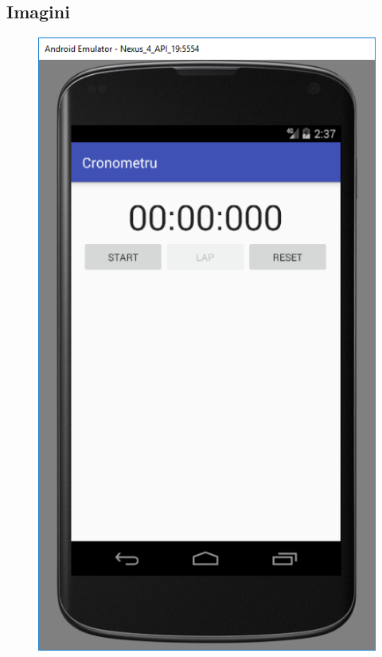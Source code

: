 \subsection{Imagini}

\begin{figure}[ht]
	\includegraphics[scale=0.35]{imagini/1-initial}
	\centering
\end{figure}

